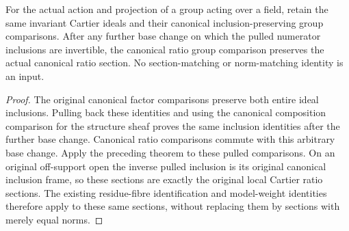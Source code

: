 \begin{corollary}
\label{cor:original-pl-group-canonical-ratio-section}
\leanok
{}
For the actual action and projection of a group acting over a field,
retain the same invariant Cartier ideals and their canonical
inclusion-preserving group comparisons. After any further base change
on which the pulled numerator inclusions are invertible, the canonical
ratio group comparison preserves the actual canonical ratio section.
No section-matching or norm-matching identity is an input.
\end{corollary}
\begin{proof}
The original canonical factor comparisons preserve both entire ideal
inclusions. Pulling back these identities and using the canonical
composition comparison for the structure sheaf proves the same
inclusion identities after the further base change. Canonical ratio
comparisons commute with this arbitrary base change. Apply the preceding
theorem to these pulled comparisons. On an original off-support open
the inverse pulled inclusion is its original canonical inclusion frame,
so these sections are exactly the original local Cartier ratio sections.
The existing residue-fibre identification and model-weight identities
therefore apply to these same sections, without replacing them by
sections with merely equal norms.
\end{proof}
